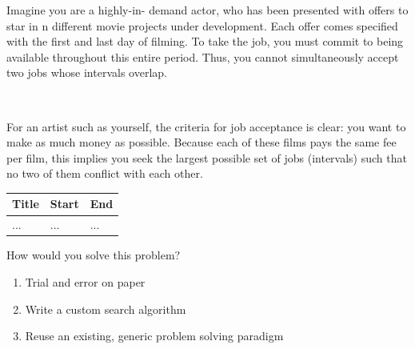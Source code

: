 \documentclass{cons-beamer}
\begin{document}
\begin{frame}
  \begin{example}
    \small
    Imagine you are a highly-in-
    demand actor, who has been presented with offers to star in n different movie
    projects under development. Each offer comes specified with the first and last day
    of filming. To take the job, you must commit to being available throughout this
    entire period. Thus, you cannot simultaneously accept two jobs whose intervals
    overlap.

    $ $
    
    For an artist such as yourself, the criteria for job acceptance is clear: you want
    to make as much money as possible. Because each of these films pays the same fee
    per film, this implies you seek the largest possible set of jobs (intervals) such that no two of them conflict with each other.

    \begin{table}[h!]
      \centering
      \tiny
      \begin{tabular}{| m{5cm} | m{2cm} | m{2cm} |}
        \hline
        \textbf{Title} & \textbf{Start} & \textbf{End} \\
        \hline
        ... & ... & ... \\
        \hline
      \end{tabular}
    \end{table}
  \end{example}
  How would you solve this problem?
  \begin{enumerate}
    \item Trial and error on paper
    \item Write a custom search algorithm
    \item Reuse an existing, generic problem solving paradigm 
  \end{enumerate}
\end{frame}
\end{document}
